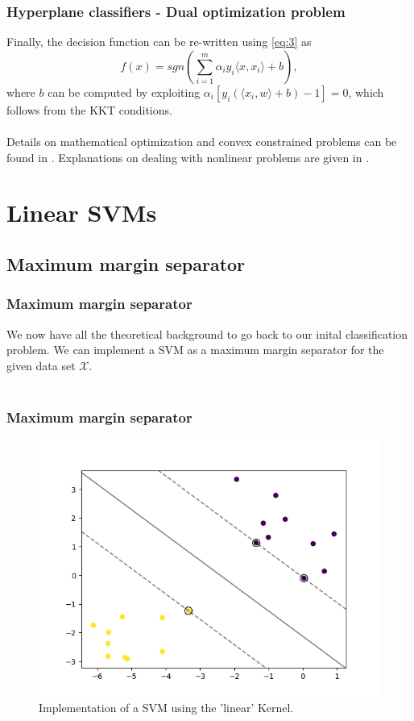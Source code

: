 \documentclass{beamer}
\begin{document}
\begin{frame}{}
    \frametitle{Hyperplane classifiers - Dual optimization problem}
    Finally, the decision function can be re-written using \eqref{eq:3} as
    \begin{equation} \label{eq:5}
        f(x) = sgn \left( \sum_{i=1}^{m} \alpha_i y_i \langle x,x_i \rangle + b \right),
    \end{equation}
    where $b$ can be computed by exploiting $\alpha_i \left[ y_i \left( \langle x_i,w \rangle + b \right) - 1 \right] = 0$, which follows from the KKT conditions. \\~\\
    Details on mathematical optimization and convex constrained problems can be found in \cite{Jarre}. Explanations on dealing with nonlinear problems are given in \cite{Reinhardt}.
\end{frame}



\section{Linear SVMs}

\subsection{Maximum margin separator}

\begin{frame}{}
    \frametitle{Maximum margin separator}
    We now have all the theoretical background to go back to our inital classification problem. We can implement a SVM as a maximum margin separator for the given data set $\mathcal{X}$. \\~\\  
\end{frame}


\begin{frame}{}
	\frametitle{Maximum margin separator}
	\begin{figure}
		\centering
		\includegraphics[width=0.7\linewidth]{img/LinearSVM_complete.png}
		\caption{Implementation of a SVM using the 'linear' Kernel.}
		\label{fig:linearsvm}
	\end{figure}
	 
\end{frame}
\end{document}
